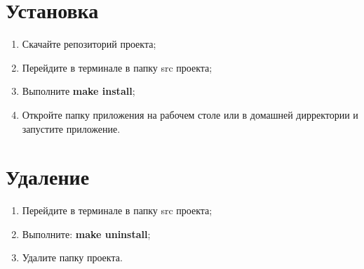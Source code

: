 \documentclass{article}
\begin{document}
\section{Установка}

\begin{enumerate}
    \item Скачайте репозиторий проекта;
    \item Перейдите в терминале в папку src проекта;
    \item Выполните \textbf{make install};
    \item Откройте папку приложения на рабочем столе или в домашней дирректории и запустите приложение.
\end{enumerate}

\section{Удаление}

\begin{enumerate}
    \item Перейдите в терминале в папку src проекта;
    \item Выполните: \textbf{make uninstall};
    \item Удалите папку проекта.
\end{enumerate}
\end{document}
